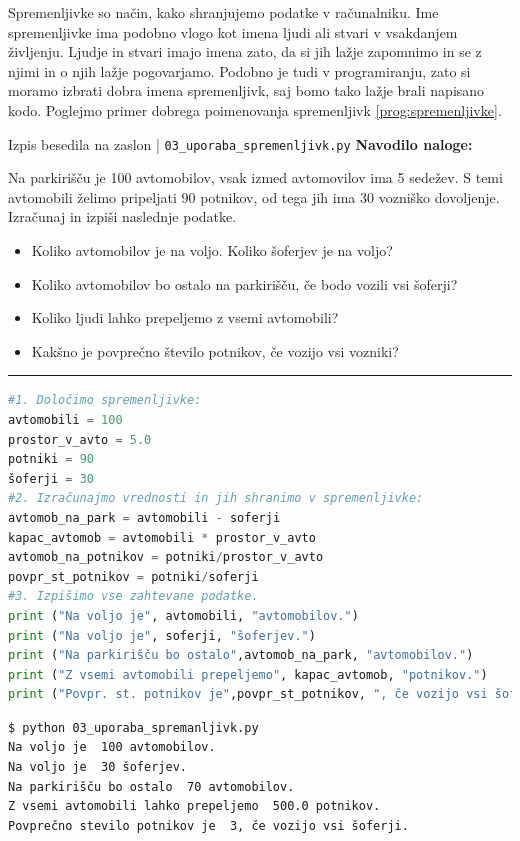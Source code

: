 Spremenljivke so način, kako shranjujemo podatke v računalniku.  Ime
spremenljivke ima podobno vlogo kot imena ljudi ali stvari v
vsakdanjem življenju. Ljudje in stvari imajo imena zato, da si jih
lažje zapomnimo in se z njimi in o njih lažje pogovarjamo. Podobno je
tudi v programiranju, zato si moramo izbrati dobra imena spremenljivk,
saj bomo tako lažje brali napisano kodo. Poglejmo primer dobrega
poimenovanja spremenljivk \ref{prog:spremenljivke}.

\begin{examplebox}[label={prog:spremenljivke}]{Izpis besedila na
    zaslon | \texttt{03\_uporaba\_spremenljivk.py} \cite{web:PTHardWay}}
\textbf{Navodilo naloge:}

Na parkirišču je 100 avtomobilov, vsak izmed avtomovilov ima 5
sedežev. S temi avtomobili želimo pripeljati 90 potnikov, od tega jih
ima 30 vozniško dovoljenje. Izračunaj in izpiši naslednje podatke.
\begin{itemize}
\item Koliko avtomobilov je na voljo.  Koliko šoferjev je na voljo?
\item Koliko avtomobilov bo ostalo na parkirišču, če bodo vozili vsi
  šoferji?
\item Koliko ljudi lahko prepeljemo z vsemi avtomobili?
\item Kakšno je povprečno število potnikov, če vozijo vsi vozniki?
\end{itemize}
\rule{\textwidth}{.4pt}
\begin{lstlisting}[language=Python]
#1. Določimo spremenljivke:
avtomobili = 100
prostor_v_avto = 5.0
potniki = 90
šoferji = 30
#2. Izračunajmo vrednosti in jih shranimo v spremenljivke:
avtomob_na_park = avtomobili - soferji
kapac_avtomob = avtomobili * prostor_v_avto
avtomob_na_potnikov = potniki/prostor_v_avto
povpr_st_potnikov = potniki/soferji
#3. Izpišimo vse zahtevane podatke.
print ("Na voljo je", avtomobili, "avtomobilov.")
print ("Na voljo je", soferji, "šoferjev.")
print ("Na parkirišču bo ostalo",avtomob_na_park, "avtomobilov.")
print ("Z vsemi avtomobili prepeljemo", kapac_avtomob, "potnikov.")
print ("Povpr. st. potnikov je",povpr_st_potnikov, ", če vozijo vsi šoferji.")
\end{lstlisting}
\tcblower
\begin{Verbatim}[fontsize=\footnotesize]
$ python 03_uporaba_spremanljivk.py
Na voljo je  100 avtomobilov.
Na voljo je  30 šoferjev.
Na parkirišču bo ostalo  70 avtomobilov.
Z vsemi avtomobili lahko prepeljemo  500.0 potnikov.
Povprečno stevilo potnikov je  3, če vozijo vsi šoferji.
\end{Verbatim}
\end{examplebox}

